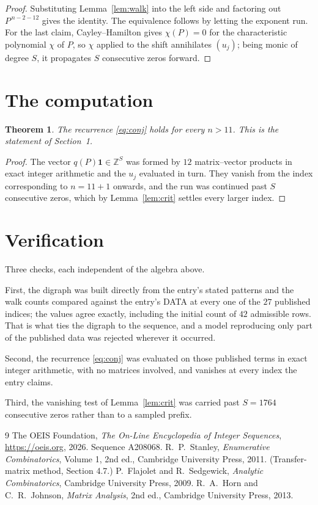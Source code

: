 \documentclass[11pt,a4paper]{article}
\theoremstyle{plain}
\newtheorem{theorem}{Theorem}
\theoremstyle{definition}
\begin{document}
\begin{proof}
Substituting Lemma~\ref{lem:walk} into the left side and factoring out
$P^{\,n-2-12}$ gives the identity. The equivalence follows by letting the exponent
run. For the last claim, Cayley--Hamilton gives $\chi(P)=0$ for the characteristic
polynomial $\chi$ of $P$, so $\chi$ applied to the shift annihilates $(u_j)$; being monic of
degree $S$, it propagates $S$ consecutive zeros forward.
\end{proof}

\section{The computation}

\begin{theorem}
The recurrence \eqref{eq:conj} holds for every $n>11$. This is the statement of
Section~1.
\end{theorem}

\begin{proof}
The vector $q(P)\mathbf{1}\in\mathbb{Z}^{S}$ was formed by $12$ matrix--vector
products in exact integer arithmetic and the $u_j$ evaluated in turn. They vanish from the
index corresponding to $n=11+1$ onwards, and the run was continued past $S$ consecutive
zeros, which by Lemma~\ref{lem:crit} settles every larger index.
\end{proof}

\section{Verification}

Three checks, each independent of the algebra above.

First, the digraph was built directly from the entry's stated patterns and the walk counts
compared against the entry's DATA at every one of the $27$ published indices; the
values agree exactly, including the initial count of $42$ admissible rows. That is
what ties the digraph to the sequence, and a model reproducing only part of the published
data was rejected wherever it occurred.

Second, the recurrence \eqref{eq:conj} was evaluated on those published terms in exact
integer arithmetic, with no matrices involved, and vanishes at every index the entry claims.

Third, the vanishing test of Lemma~\ref{lem:crit} was carried past $S=1764$ consecutive
zeros rather than to a sampled prefix.

\begin{thebibliography}{9}
 The OEIS Foundation, \emph{The On-Line Encyclopedia of Integer
Sequences}, \url{https://oeis.org}, 2026. Sequence A208068.
 R.~P.~Stanley, \emph{Enumerative Combinatorics}, Volume 1, 2nd ed.,
Cambridge University Press, 2011. (Transfer-matrix method, Section 4.7.)
 P.~Flajolet and R.~Sedgewick, \emph{Analytic Combinatorics}, Cambridge
University Press, 2009.
 R.~A.~Horn and C.~R.~Johnson, \emph{Matrix Analysis}, 2nd ed., Cambridge
University Press, 2013.
\end{thebibliography}
\end{document}
